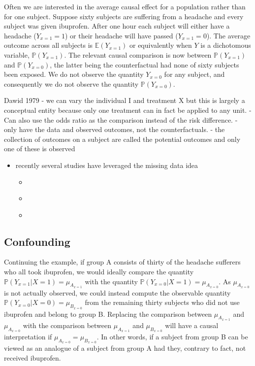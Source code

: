 \documentclass[11pt]{article}
\providecommand{\tightlist}{%
      \setlength{\itemsep}{0pt}\setlength{\parskip}{0pt}}
\begin{document}
Often we are interested in the average causal effect for a population
rather than for one subject. Suppose sixty subjects are suffering from a
headache and every subject was given ibuprofen. After one hour each
subject will either have a headache (\(Y_{x=1}=1\)) or their headache
will have passed (\(Y_{x=1}=0\)). The average outcome across all
subjects is \(\mathbb{E}(Y_{x = 1})\) or equivalently when \(Y\) is a
dichotomous variable, \(\mathbb{P}(Y_{x = 1})\). The relevant causal
comparison is now between \(\mathbb{P}(Y_{x = 1})\) and
\(\mathbb{P}(Y_{x = 0})\), the latter being the counterfactual had none
of sixty subjects been exposed. We do not observe the quantity
\(Y_{x=0}\) for any subject, and consequently we do not observe the
quantity \(\mathbb{P}(Y_{x = 0})\). \linebreak

Dawid 1979 - we can vary the individual I and treatment X but this is
largely a conceptual entity because only one treatment can in fact be
applied to any unit. - Can also use the odds ratio as the comparison
instead of the risk difference. - only have the data and observed
outcomes, not the counterfactuals. - the collection of outcomes on a
subject are called the potential outcomes and only one of these is
observed

\begin{itemize}
\tightlist
\item
  recently several studies have leveraged the missing data idea

  \begin{itemize}
  \tightlist
  \item
    \citet{Ding2017}
  \item
    \citet{Howe2015}
  \item
    \citet{Edwards2015}
  \end{itemize}
\end{itemize}

    \subsection{Confounding}\label{confounding}

Continuing the example, if group A consists of thirty of the headache
sufferers who all took ibuprofen, we would ideally compare the quantity
\(\mathbb{P}(Y_{x = 1}|X = 1) = \mu_{A_{x = 1}}\) with the quantity
\(\mathbb{P}(Y_{x = 0}|X = 1) = \mu_{A_{x = 0}}\). As
\(\mu_{A_{x = 0}}\) is not actually observed, we could instead compute
the observable quantity \(\mathbb{P}(Y_{x = 0}|X = 0) = \mu_{B_{x=0}}\)
from the remaining thirty subjects who did not use ibuprofen and belong
to group B. Replacing the comparison between \(\mu_{A_{x = 1}}\) and
\(\mu_{A_{x = 0}}\) with the comparison between \(\mu_{A_{x = 1}}\) and
\(\mu_{B_{x=0}}\) will have a causal interpretation if
\(\mu_{A_{x = 0}} = \mu_{B_{x=0}}\). In other words, if a subject from
group B can be viewed as an analogue of a subject from group A had they,
contrary to fact, not received ibuprofen. \linebreak
\end{document}
